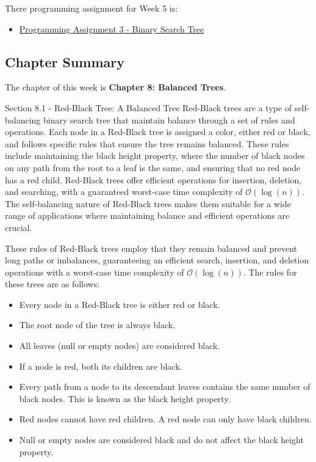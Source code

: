 There programming assignment for Week 5 is:

\begin{itemize}
    \item \href{https://github.com/QuantumCompiler/CU/tree/main/CSPB%202270%20-%20Data%20Structures/Assignments/Assignment%203%20-%20Binary%20Search%20Tree}{Programming Assignment 3 - Binary Search Tree}
\end{itemize}

\subsection{Chapter Summary}

The chapter of this week is \textbf{Chapter 8: Balanced Trees}.

\begin{notes}{Section 8.1 - Red-Black Tree: A Balanced Tree}
    Red-Black trees are a type of self-balancing binary search tree that maintain balance through a set of rules and operations. Each node in a Red-Black tree is assigned a color, either red or black, and follows specific rules that ensure the tree remains balanced. These rules include maintaining the black height property, where the number of black 
    nodes on any path from the root to a leaf is the same, and ensuring that no red node has a red child. Red-Black trees offer efficient operations for insertion, deletion, and searching, with a guaranteed worst-case time complexity of $\mathcal{O}(\log{(n)})$. The self-balancing nature of Red-Black trees makes them suitable for a wide range of applications where 
    maintaining balance and efficient operations are crucial.
    
    These rules of Red-Black trees employ that they remain balanced and prevent long paths or imbalances, guaranteeing an efficient search, insertion, and deletion operations with a worst-case time complexity of $\mathcal{O}(\log{(n)})$. The rules for these trees are as follows:
    
    \begin{itemize}
        \item Every node in a Red-Black tree is either red or black.
        \item The root node of the tree is always black.
        \item All leaves (null or empty nodes) are considered black.
        \item If a node is red, both its children are black.
        \item Every path from a node to its descendant leaves contains the same number of black nodes. This is known as the black height property.
        \item Red nodes cannot have red children. A red node can only have black children.
        \item Null or empty nodes are considered black and do not affect the black height property.
    \end{itemize}
\end{notes}

